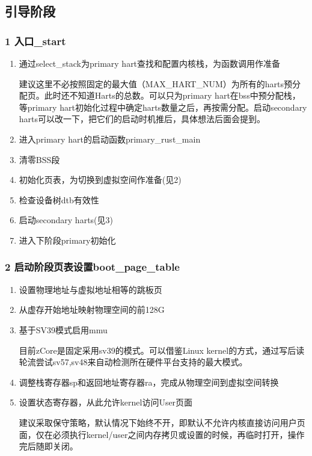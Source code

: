 \documentclass[
8pt, %
]{beamer}
\begin{document}
	\subsection{引导阶段}

	\begin{frame}
		\frametitle{1 入口\_start}
		\begin{enumerate}
			\item 通过select\_stack为primary hart查找和配置内核栈，为函数调用作准备
			\begin{block}{}
			建议这里不必按照固定的最大值（MAX\_HART\_NUM）为所有的harts预分配页。此时还不知道Harts的总数。可以只为primary hart在bss中预分配栈，等primary hart初始化过程中确定harts数量之后，再按需分配。启动secondary harts可以改一下，把它们的启动时机推后，具体想法后面会提到。
			\end{block}
			\item 进入primary hart的启动函数primary\_rust\_main
			\item 清零BSS段
			\item 初始化页表，为切换到虚拟空间作准备(见2)
			\item 检查设备树dtb有效性
			\item 启动secondary harts(见3)
			\item 进入下阶段primary初始化
		\end{enumerate}
	\end{frame}

	\begin{frame}
		\frametitle{2 启动阶段页表设置boot\_page\_table}
		\begin{enumerate}
			\item 设置物理地址与虚拟地址相等的跳板页
			\item 从虚存开始地址映射物理空间的前128G
			\item 基于SV39模式启用mmu
			\begin{block}{}
				目前zCore是固定采用sv39的模式。可以借鉴Linux kernel的方式，通过写后读轮流尝试sv57,sv48来自动检测所在硬件平台支持的最大模式。
			\end{block}
			\item 调整栈寄存器sp和返回地址寄存器ra，完成从物理空间到虚拟空间转换
			\item 设置状态寄存器，从此允许kernel访问User页面
			\begin{block}{}
				建议采取保守策略，默认情况下始终不开，即默认不允许内核直接访问用户页面，仅在必须执行kernel/user之间内存拷贝或设置的时候，再临时打开，操作完后随即关闭。
			\end{block}
		\end{enumerate}
	\end{frame}
\end{document}
